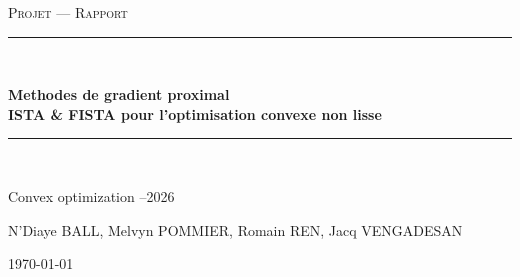 \documentclass[11pt,a4paper]{article}
\theoremstyle{definition}
\theoremstyle{plain}
\begin{document}
\begin{titlepage}
\centering
\vspace*{2cm}
{\scshape\large Projet --- Rapport\par}
\vspace{1.5cm}
\rule{\linewidth}{0.4pt}\\[0.4cm]
{\huge\bfseries Methodes de gradient proximal\\[0.3cm]
\large ISTA \& FISTA pour l'optimisation convexe non lisse\par}
\rule{\linewidth}{0.4pt}\\[1.5cm]
{\large Convex optimization --2026\par}
\vspace{2cm}
{\large N'Diaye BALL, Melvyn POMMIER, Romain REN, Jacq VENGADESAN\par}
\vfill
{\large \today\par}
\end{titlepage}

\tableofcontents
\newpage







\end{document}
